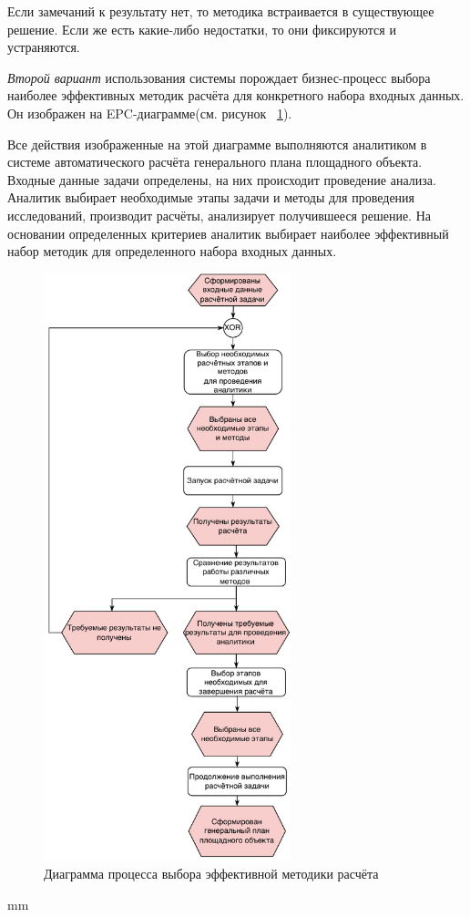 Если замечаний к результату нет, то методика встраивается в существующее решение.
Если же есть какие-либо недостатки, то они фиксируются и устраняются.


\textit{Второй вариант} использования системы порождает бизнес-процесс
выбора наиболее эффективных методик расчёта для конкретного набора входных данных.
Он изображен на EPC-диаграмме(см. рисунок \ \ref{pic:analysis__usecases-analytics-epc}).

Все действия изображенные на этой диаграмме выполняются аналитиком в системе автоматического
расчёта генерального плана площадного объекта.
Входные данные задачи определены, на них происходит проведение анализа.
Аналитик выбирает необходимые этапы задачи и методы для проведения исследований, производит расчёты,
анализирует получившееся решение. На основании определенных критериев аналитик выбирает наиболее
эффективный набор методик для определенного набора входных данных.

\begin{figure}[H]
	\hspace*{-4.5 cm}
	\includegraphics[width=0.64\textwidth, left]{analysis/pictures/usecases/analytics_epc}
	\caption{Диаграмма процесса выбора эффективной методики расчёта}
	\label{pic:analysis__usecases-analytics-epc}
\end{figure}
 mm
